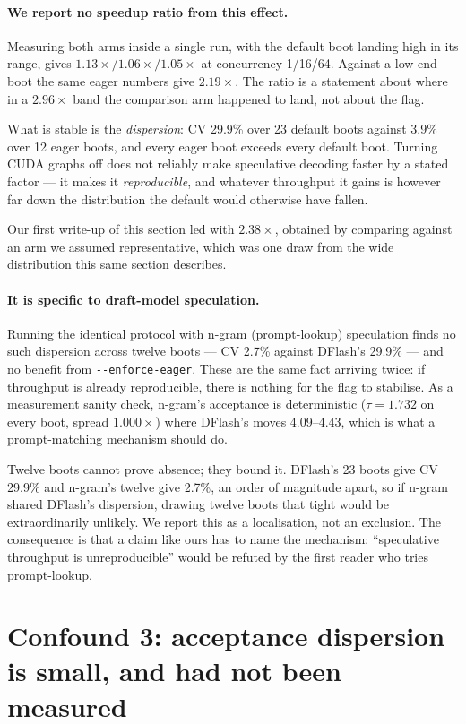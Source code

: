 \documentclass[11pt]{article}
\newcommand{\tw}[1]{\texttt{\small #1}}
\begin{document}
\paragraph{We report no speedup ratio from this effect.} Measuring both arms
inside a single run, with the default boot landing high in its range, gives
$1.13\times / 1.06\times / 1.05\times$ at concurrency 1/16/64. Against a
low-end boot the same eager numbers give $2.19\times$. The ratio is a
statement about where in a $2.96\times$ band the comparison arm happened to
land, not about the flag.

What is stable is the \emph{dispersion}: CV 29.9\% over 23 default boots
against 3.9\% over 12 eager boots, and every eager boot exceeds every
default boot. Turning CUDA graphs off does not reliably make speculative
decoding faster by a stated factor --- it makes it \emph{reproducible}, and
whatever throughput it gains is however far down the distribution the
default would otherwise have fallen.

Our first write-up of this section led with $2.38\times$, obtained by
comparing against an arm we assumed representative, which was one draw from
the wide distribution this same section describes.

\paragraph{It is specific to draft-model speculation.} Running the identical
protocol with n-gram (prompt-lookup) speculation finds no such dispersion
across twelve boots --- CV 2.7\% against DFlash's 29.9\% --- and no benefit
from \tw{-{}-enforce-eager}. These are the same
fact arriving twice: if throughput is already reproducible, there is nothing
for the flag to stabilise. As a measurement sanity check, n-gram's acceptance is deterministic
($\tau = 1.732$ on every boot, spread $1.000\times$) where DFlash's moves
4.09--4.43, which is what a prompt-matching mechanism should do.

Twelve boots cannot prove absence; they bound it. DFlash's 23 boots give
CV 29.9\% and n-gram's twelve give 2.7\%, an order of magnitude apart, so
if n-gram shared DFlash's dispersion, drawing twelve boots that tight would
be extraordinarily unlikely. We report this as a localisation, not an
exclusion. The
consequence is that a claim like ours has to name the mechanism:
``speculative throughput is unreproducible'' would be refuted by the first
reader who tries prompt-lookup.

\section{Confound 3: acceptance dispersion is small, and had not been
measured}\label{sec:c3}
\end{document}
